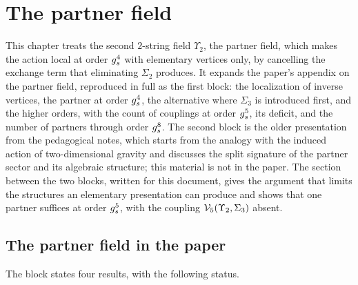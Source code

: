 \section{The partner field}
\label{ch:partner-field}

This chapter treats the second $2$-string field $\Upsilon_2$, the partner field, which makes the action local at order $g_s^4$ with elementary vertices only, by cancelling the exchange term that eliminating $\Sigma_2$ produces.
It expands the paper's appendix on the partner field, reproduced in full as the first block: the localization of inverse vertices, the partner at order $g_s^4$, the alternative where $\Sigma_3$ is introduced first, and the higher orders, with the count of couplings at order $g_s^5$, its deficit, and the number of partners through order $g_s^8$.
The second block is the older presentation from the pedagogical notes, which starts from the analogy with the induced action of two-dimensional gravity and discusses the split signature of the partner sector and its algebraic structure; this material is not in the paper.
The section between the two blocks, written for this document, gives the argument that limits the structures an elementary presentation can produce and shows that one partner suffices at order $g_s^5$, with the coupling $\mathcal{V}_{5}(\Upsilon_2, \Sigma_3)$ absent.

\subsection{The partner field in the paper}
\label{sec:partner:paper}

The block states four results, with the following status.

